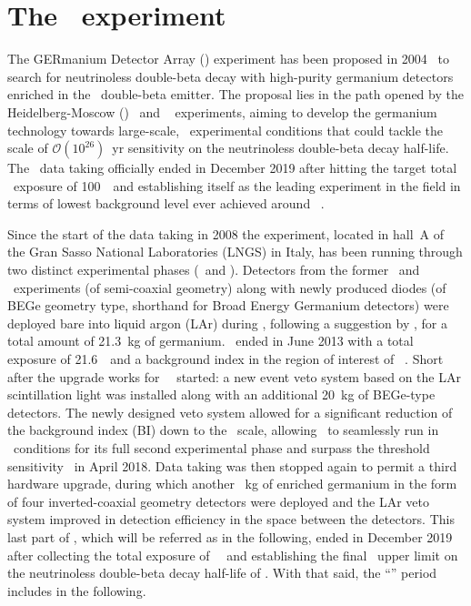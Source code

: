 \chapter{The \gerda\ experiment}\label{chap:gerda}

The GERmanium Detector Array (\gerda) experiment has been proposed in
2004~\cite{gerda-proposal} to search for neutrinoless double-beta decay with high-purity
germanium detectors enriched in the \gesix\ double-beta emitter. The proposal lies in the
path opened by the Heidelberg-Moscow (\hdm)~\cite{Klapdor2001} and
\igex~\cite{Aalseth2002} experiments, aiming to develop the germanium technology towards
large-scale, \bkgfree\ experimental conditions that could tackle the scale of
$\mathcal{O}(10^{26})$~yr sensitivity on the neutrinoless double-beta decay half-life. The
\gerda\ data taking officially ended in December 2019 after hitting the target total
\bkgfree\ exposure of 100~\kgyr\ and establishing itself as the leading experiment in the
field in terms of lowest background level ever achieved around \qbb~\cite{Agostini2019a}.

Since the start of the data taking in 2008 the experiment, located in hall~A of the Gran
Sasso National Laboratories (LNGS) in Italy, has been running through two distinct
experimental phases (\phaseone\ and \phasetwo). Detectors from the former \hdm\ and
\igex\ experiments (of semi-coaxial geometry) along with newly produced diodes (of BEGe
geometry type, shorthand for Broad Energy Germanium detectors) were deployed bare into
liquid argon (LAr) during \phaseone, following a suggestion by \fillme, for a total amount
of 21.3~kg of germanium. \phaseone\ ended in June 2013 with a total exposure of
21.6~\kgyr\ and a background index in the region of interest of \pIbi~\cite{Agostini2016}.
Short after the upgrade works for \gerda\ \phasetwo\ started: a new event veto system
based on the LAr scintillation light was installed along with an additional 20~kg of
BEGe-type detectors.  The newly designed veto system allowed for a significant reduction
of the background index (BI) down to the \vctsper\ scale, allowing \gerda\ to seamlessly
run in \bkgfree\ conditions for its full second experimental phase and surpass the
 threshold sensitivity~\cite{Agostini2019a} in April 2018. Data taking was
then stopped again to permit a third hardware upgrade, during which another \fillme~kg of
enriched germanium in the form of four inverted-coaxial geometry detectors were deployed
and the LAr veto system improved in detection efficiency in the space between the
detectors. This last part of \phasetwo, which will be referred as \phasetwop in the
following, ended in December 2019 after collecting the total exposure of \fillme~\kgyr\
and establishing the final \gerda\ upper limit on the neutrinoless double-beta decay
half-life of \gerdafinallimit. With that said, the ``\phasetwo'' period includes
\phasetwop in the following.

